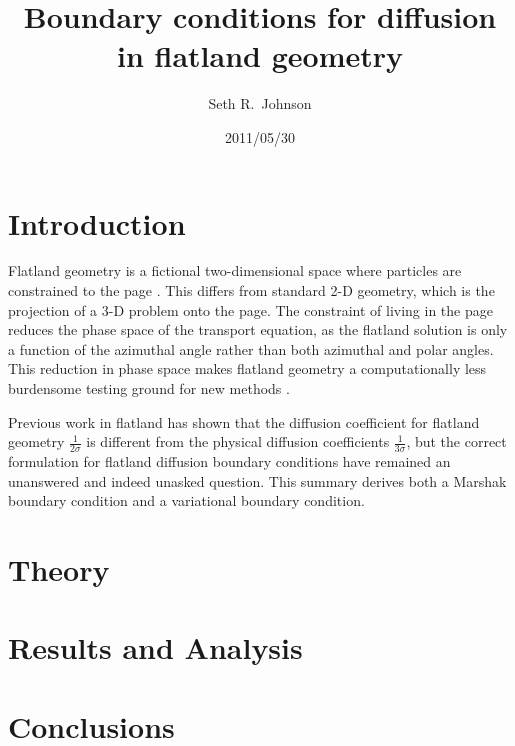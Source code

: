 \documentclass{anstrans}
\title{Boundary conditions for diffusion in flatland geometry}
\author{Seth R.~Johnson}
\institute{Department of Nuclear Engineering \& Radiological Sciences, University of Michigan, Ann Arbor, MI, 48109}
\date{2011/05/30}
\begin{document}
\section{Introduction}
Flatland geometry is a fictional two-dimensional space where particles are
constrained to the page \cite{Asa2008}. This differs from standard 2-D
geometry, which is the projection of a 3-D problem onto the page. The
constraint of living in the page reduces the phase space of the transport
equation, as the flatland solution is only a function of the azimuthal angle
rather than both azimuthal and polar angles. This reduction in phase space
makes flatland geometry a computationally less burdensome testing ground for new
methods \cite{Lar2009a}.

Previous work in flatland has shown that the diffusion
coefficient for flatland geometry $\frac{1}{2\sigma}$ is different from
the physical diffusion coefficients $\frac{1}{3\sigma}$, but the correct
formulation for flatland diffusion boundary conditions have remained an
unanswered and indeed unasked question. This summary derives both a Marshak
boundary condition and a variational boundary condition.

\section{Theory}
\section{Results and Analysis}
\section{Conclusions}


\end{document}
